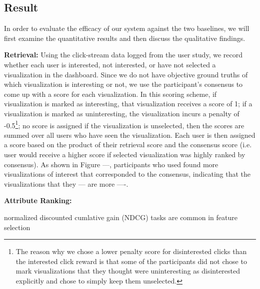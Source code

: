 \subsection{Result}
In order to evaluate the efficacy of our system against the two baselines, we will first examine the quantitative results and then discuss the qualitative findings.
\par \textbf{Retrieval:} Using the click-stream data logged from the user study, we record whether each user is interested, not interested, or have not selected a visualization in the dashboard. Since we do not have objective ground truths of which visualization is interesting or not, we use the participant's consensus to come up with a score for each visualization. In this scoring scheme, if visualization is marked as interesting, that visualization receives a score of 1; if a visualization is marked as uninteresting, the visualization incurs a penalty of -0.5\footnote{The reason why we chose a lower penalty score for disinterested clicks than the interested click reward is that some of the participants did not chose to mark visualizations that they thought were uninteresting as disinterested explicitly and chose to simply keep them unselected.}; no score is assigned if the visualization is unselected, then the scores are summed over all users who have seen the visualization. Each user is then assigned a score based on the product of their retrieval score and the consensus score (i.e. user would receive a higher score if selected visualization was highly ranked by consensus). As shown in Figure ---, participants who used \storyboard found more visualizations of interest that corresponded to the consensus, indicating that the visualizations that they --- are more ----.  

\par \textbf{Attribute Ranking:}

normalized discounted cumlative gain (NDCG)
tasks are common in feature selection 